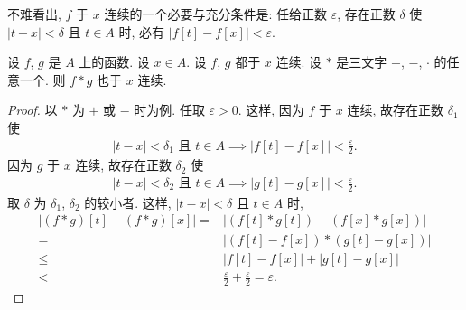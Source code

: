 不难看出,
$f$ 于 $x$ 连续的一个必要与充分条件是:
任给正数 $\varepsilon$,
存在正数 $\delta$ 使
$|t - x| < \delta$ 且 $t \in A$ 时,
必有 $|f[t] - f[x]| < \varepsilon$.

\begin{theorem}
    设 $f$, $g$ 是 $A$ 上的函数.
    设 $x \in A$.
    设 $f$, $g$ 都于 $x$ 连续.
    设 $\ast$ 是三文字 $+$, $-$, $\cdot$ 的任意一个.
    则 $f \ast g$ 也于 $x$ 连续.
\end{theorem}

\begin{proof}
    以 $\ast$ 为 $+$ 或 $-$ 时为例.
    任取 $\varepsilon > 0$.
    这样, 因为 $f$ 于 $x$ 连续,
    故存在正数 $\delta_1$ 使
    \begin{align*}
        \text{$|t - x| < \delta_1$ 且 $t \in A$} \implies |f[t] - f[x]| < \frac{\varepsilon}{2}.
    \end{align*}
    因为 $g$ 于 $x$ 连续,
    故存在正数 $\delta_2$ 使
    \begin{align*}
        \text{$|t - x| < \delta_2$ 且 $t \in A$} \implies |g[t] - g[x]| < \frac{\varepsilon}{2}.
    \end{align*}
    取 $\delta$ 为 $\delta_1$, $\delta_2$ 的较小者.
    这样, $|t - x| < \delta$ 且 $t \in A$ 时,
    \begin{align*}
        {|(f \ast g)[t] - (f \ast g)[x]|}
        = {}    & {|(f[t] \ast g[t]) - (f[x] \ast g[x])|}       \\
        = {}    & {|(f[t] - f[x]) \ast (g[t] - g[x])|}          \\
        \leq {} & {|f[t] - f[x]| + |g[t] - g[x]|}               \\
        < {}    & \frac{\varepsilon}{2} + \frac{\varepsilon}{2}
        = \varepsilon.
    \end{align*}


\end{proof}
